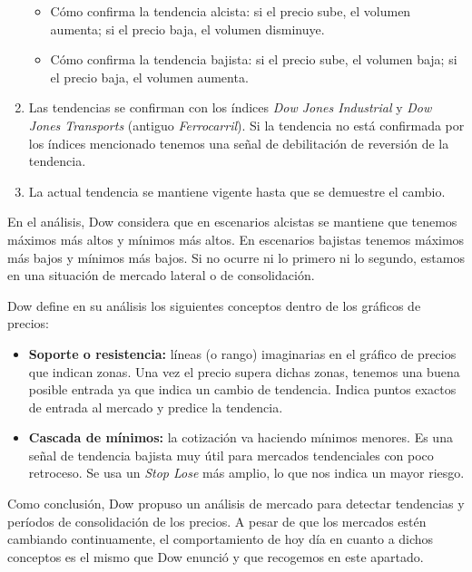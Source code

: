 \begin{enumerate}
	\begin{itemize}
		\item Cómo confirma la tendencia alcista: si el precio sube, el volumen aumenta; si el precio baja, el volumen disminuye.
		\item Cómo confirma la tendencia bajista: si el precio sube, el volumen baja; si el precio baja, el volumen aumenta.
	\end{itemize} 
	\item Las tendencias se confirman con los índices \textit{Dow Jones Industrial} y \textit{Dow Jones Transports} (antiguo \textit{Ferrocarril}). Si la tendencia no está confirmada por los índices mencionado tenemos una señal de debilitación de reversión de la tendencia.
	\item La actual tendencia se mantiene vigente hasta que se demuestre el cambio.
	
\end{enumerate} 

En el análisis, Dow considera que en escenarios alcistas se mantiene que tenemos máximos más altos y mínimos más altos. En escenarios bajistas tenemos máximos más bajos y mínimos más bajos. Si no ocurre ni lo primero ni lo segundo, estamos en una situación de mercado lateral o de consolidación. \newline

Dow define en su análisis los siguientes conceptos dentro de los gráficos de precios: \newline

\begin{itemize}
	\item \textbf{Soporte o resistencia:} líneas (o rango) imaginarias en el gráfico de precios que indican zonas. Una vez el precio supera dichas zonas, tenemos una buena posible entrada ya que indica un cambio de tendencia. Indica puntos exactos de entrada al mercado y predice la tendencia.
	\item \textbf{Cascada de mínimos:} la cotización va haciendo mínimos menores. Es una señal de tendencia bajista muy útil para mercados tendenciales con poco retroceso. Se usa un \textit{Stop Lose} más amplio, lo que nos indica un mayor riesgo.
\end{itemize}

Como conclusión, Dow propuso un análisis de mercado para detectar tendencias y períodos de consolidación de los precios. A pesar de que los mercados estén cambiando continuamente, el comportamiento de hoy día en cuanto a dichos conceptos es el mismo que Dow enunció y que recogemos en este apartado.


